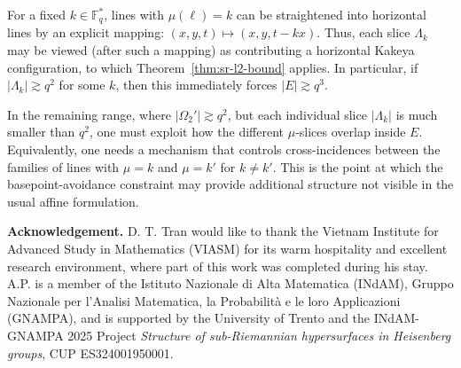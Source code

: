 \documentclass[11pt]{article}
\newcommand{\F}{\mathbb{F}}
\newcommand{\1}{\mathbf 1}
\begin{document}
For a fixed $k\in\F_q^*$, lines with $\mu(\ell)=k$ can be straightened into horizontal lines by an explicit mapping:
 $(x,y,t)\mapsto(x,y,t-kx)$.
Thus, each slice $\Lambda_k$ may be viewed (after such a mapping) as contributing a horizontal Kakeya configuration, to which Theorem~\ref{thm:sr-l2-bound} applies.
In particular, if $|\Lambda_k|\gtrsim q^2$ for some $k$, then this immediately forces $|E|\gtrsim q^3$.

In the remaining range, where $|\Omega_2'|\gtrsim q^2$, but each individual slice $|\Lambda_k|$ is much smaller than $q^2$, one must exploit how the different $\mu$-slices overlap inside $E$.
Equivalently, one needs a mechanism that controls cross-incidences between the families of lines with $\mu=k$ and $\mu=k'$ for $k\neq k'$.
This is the point at which the basepoint-avoidance constraint may provide additional structure not visible in the usual affine formulation.



{\bf Acknowledgement.} 
D. T. Tran would like to thank the Vietnam Institute for Advanced Study in Mathematics (VIASM) for its warm hospitality and excellent research environment, where part of this work was completed during his stay. A.P. is a member of the Istituto Nazionale di Alta Matematica (INdAM), Gruppo Nazionale per l'Analisi Matematica, la Probabilità e le loro Applicazioni (GNAMPA), and is supported by the University of Trento and the INdAM-GNAMPA 2025 Project \emph{Structure of sub-Riemannian hypersurfaces in Heisenberg groups}, CUP ES324001950001.
\end{document}
